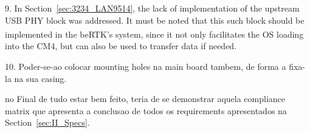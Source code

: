 9. %
In Section~\ref{sec:3234_LAN9514}, the lack of implementation of the upstream USB PHY block was addressed. It must be noted that this such block should be implemented in the beRTK\textsuperscript{\textregistered}'s system, since it not only facilitates the OS loading into the CM4, but can also be used to transfer data if needed.

10.
Poder-se-ao colocar mounting holes na main board tambem, de forma a fixa-la na sua casing.

no Final de tudo estar bem feito, teria de se demonstrar aquela compliance matrix que apresenta a conclusao de todos os requirements apresentados na Section~\ref{sec:II_Specs}.
